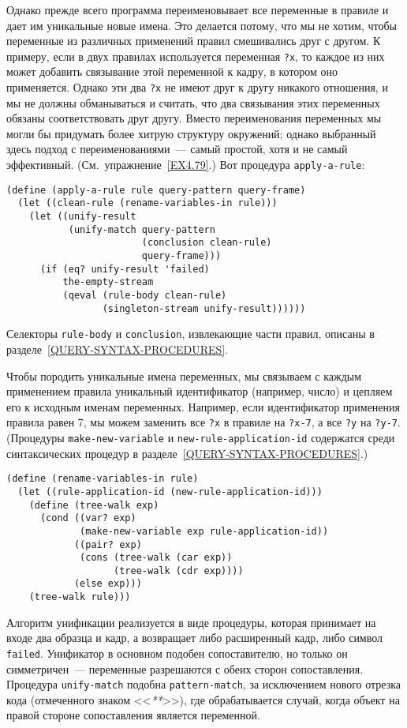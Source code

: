 Однако прежде всего программа переименовывает все
переменные в правиле и дает им уникальные новые имена.  Это делается потому,
что мы не хотим, чтобы переменные из различных
применений правил смешивались друг с другом.  К примеру, если в двух
правилах используется переменная {\tt ?x}, то каждое из них
может добавить связывание этой переменной к кадру, в котором оно
применяется.  Однако эти два {\tt ?x} не имеют друг к другу
никакого отношения, и мы не должны обманываться и считать, что два
связывания этих переменных обязаны соответствовать друг другу.  Вместо
переименования переменных мы могли бы придумать более хитрую
структуру окружений; однако выбранный здесь подход с
переименованиями~--- самый простой, хотя и не самый эффективный.
(См.~упражнение~\ref{EX4.79}.)  Вот процедура
{\tt apply-a-rule}:

\begin{Verbatim}[fontsize=\small]
(define (apply-a-rule rule query-pattern query-frame)
  (let ((clean-rule (rename-variables-in rule)))
    (let ((unify-result
           (unify-match query-pattern
                        (conclusion clean-rule)
                        query-frame)))
      (if (eq? unify-result 'failed)
          the-empty-stream
          (qeval (rule-body clean-rule)
                 (singleton-stream unify-result))))))
\end{Verbatim}
Селекторы {\tt rule-body} и {\tt conclusion},
извлекающие части правил, описаны в 
разделе~\ref{QUERY-SYNTAX-PROCEDURES}.

Чтобы породить уникальные имена переменных, мы связываем с
каждым применением правила уникальный идентификатор (например, число)
и цепляем его к исходным именам переменных.  Например, если
идентификатор применения правила равен 7, мы можем заменить все
{\tt ?x} в правиле на {\tt ?x-7}, а все {\tt ?y}
на {\tt ?y-7}. (Процедуры {\tt make-new-variable} и
{\tt new-rule-application-id} содержатся среди синтаксических
процедур в разделе~\ref{QUERY-SYNTAX-PROCEDURES}.)

\begin{Verbatim}[fontsize=\small]
(define (rename-variables-in rule)
  (let ((rule-application-id (new-rule-application-id)))
    (define (tree-walk exp)
      (cond ((var? exp)
             (make-new-variable exp rule-application-id))
            ((pair? exp)
             (cons (tree-walk (car exp))
                   (tree-walk (cdr exp))))
            (else exp)))
    (tree-walk rule)))
\end{Verbatim}

Алгоритм 
унификации реализуется в виде процедуры, которая
принимает на входе два образца и кадр, а возвращает либо расширенный
кадр, либо символ {\tt failed}.  Унификатор в основном подобен
сопоставителю, но только он симметричен~--- переменные разрешаются с
обеих сторон сопоставления. Процедура {\tt unify-match} подобна
{\tt pattern-match}, за исключением нового отрезка кода
(отмеченного знаком <<{\em ***}>>), где
обрабатывается случай, когда объект на правой стороне сопоставления
является переменной.

